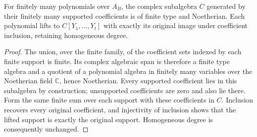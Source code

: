 \begin{lemma}
\label{hir:relative-normal-finite-type-coefficient-algebra}
\leanok
{}
For finitely many polynomials over $A_B$, the complex subalgebra $C$ generated
by their finitely many supported coefficients is of finite type and
Noetherian. Each polynomial lifts to $C[Y_1,\ldots,Y_t]$ with exactly its
original image under coefficient inclusion, retaining homogeneous degree.
\end{lemma}
\begin{proof}
The union, over the finite family, of the coefficient sets indexed by each
finite support is finite. Its complex algebraic span is therefore a finite
type algebra and a quotient of a polynomial algebra in finitely many variables
over the Noetherian field $\mathbb C$, hence Noetherian. Every supported
coefficient lies in this subalgebra by construction; unsupported coefficients
are zero and also lie there. Form the same finite sum over each support with
these coefficients in $C$. Inclusion recovers every original coefficient,
and injectivity of inclusion shows that the lifted support is exactly the
original support. Homogeneous degree is consequently unchanged.
\end{proof}

